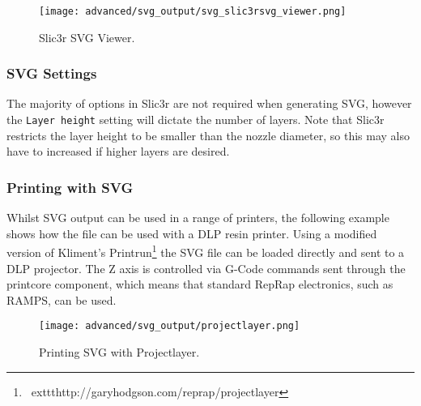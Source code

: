 \begin{figure}[H]
\centering
\texttt{[image: advanced/svg\_output/svg\_slic3rsvg\_viewer.png]}
\caption{Slic3r SVG Viewer.}
\label{fig:svg_slic3rsvg_viewer}
\end{figure}

\subsubsection{SVG Settings} %
\label{sub:svg_settings}

The majority of options in Slic3r are not required when generating SVG, however the \texttt{Layer height} setting will dictate the number of layers.  Note that Slic3r restricts the layer height to be smaller than the nozzle diameter, so this may also have to increased if higher layers are desired.


\subsubsection{Printing with SVG} %
\label{sub:printing_with_svg}

Whilst SVG output can be used in a range of printers, the following example shows how the file can be used with a DLP resin printer.  Using a modified version of Kliment's Printrun\footnote{\	exttt{http://garyhodgson.com/reprap/projectlayer}} the SVG file can be loaded directly and sent to a DLP projector.  The Z axis is controlled via G-Code commands sent through the printcore component, which means that standard RepRap electronics, such as RAMPS, can be used.


\begin{figure}[H]
\centering
\texttt{[image: advanced/svg\_output/projectlayer.png]}
\caption{Printing SVG with Projectlayer.}
\label{fig:projectlayer}
\end{figure}



